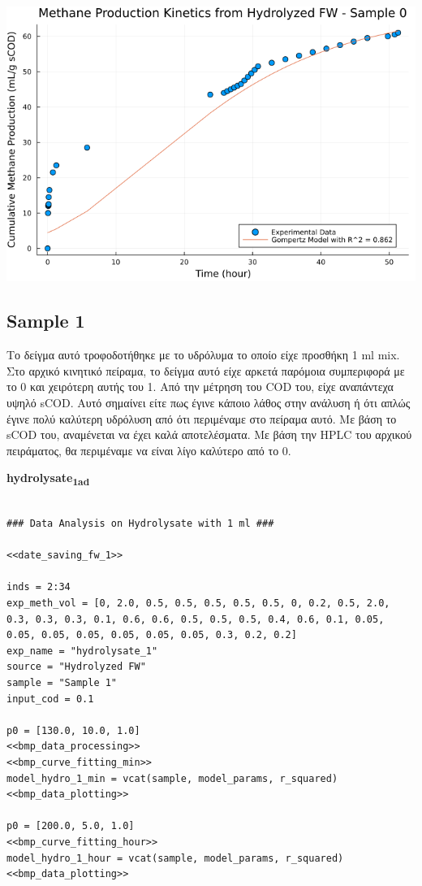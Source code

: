 \documentclass[11pt]{article}
\begin{document}
\begin{center}
\includegraphics[width=.9\linewidth]{../plots/BMPs/Hydrolyzed FW/methane_kinetics_hydrolysate_0_hour.png}
\end{center}

\subsection{Sample 1}
\label{sec:orge28bb9f}
Το δείγμα αυτό τροφοδοτήθηκε με το υδρόλυμα το οποίο είχε προσθήκη 1 ml mix. Στο αρχικό κινητικό πείραμα, το δείγμα αυτό είχε αρκετά παρόμοια συμπεριφορά με το 0 και χειρότερη αυτής του 1. Από την μέτρηση του COD του, είχε αναπάντεχα υψηλό sCOD. Αυτό σημαίνει είτε πως έγινε κάποιο λάθος στην ανάλυση ή ότι απλώς έγινε πολύ καλύτερη υδρόλυση από ότι περιμέναμε στο πείραμα αυτό. Με βάση το sCOD του, αναμένεται να έχει καλά αποτελέσματα. Με βάση την HPLC του αρχικού πειράματος, θα περιμέναμε να είναι λίγο καλύτερο από το 0.

\textbf{hydrolysate\textsubscript{1}\textsubscript{ad}}
\begin{verbatim}

### Data Analysis on Hydrolysate with 1 ml ###

<<date_saving_fw_1>>

inds = 2:34
exp_meth_vol = [0, 2.0, 0.5, 0.5, 0.5, 0.5, 0.5, 0, 0.2, 0.5, 2.0, 0.3, 0.3, 0.3, 0.1, 0.6, 0.6, 0.5, 0.5, 0.5, 0.4, 0.6, 0.1, 0.05, 0.05, 0.05, 0.05, 0.05, 0.05, 0.05, 0.3, 0.2, 0.2]
exp_name = "hydrolysate_1"
source = "Hydrolyzed FW"
sample = "Sample 1"
input_cod = 0.1

p0 = [130.0, 10.0, 1.0]
<<bmp_data_processing>>
<<bmp_curve_fitting_min>>
model_hydro_1_min = vcat(sample, model_params, r_squared)
<<bmp_data_plotting>>

p0 = [200.0, 5.0, 1.0]
<<bmp_curve_fitting_hour>>
model_hydro_1_hour = vcat(sample, model_params, r_squared)
<<bmp_data_plotting>>
\end{verbatim}
\end{document}
